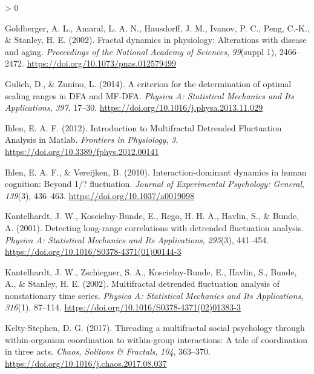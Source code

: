 \documentclass[
  english,
  man]{apa6}
\newlength{\cslhangindent}
\newenvironment{CSLReferences}[2] %
 {%
  \setlength{\parindent}{0pt}
  \ifodd #1 \everypar{\setlength{\hangindent}{\cslhangindent}}\ignorespaces\fi
  \ifnum #2 > 0
  \setlength{\parskip}{#2\baselineskip}
  \fi
 }%
 {}
\begin{document}
\begin{CSLReferences}{1}{0}
\leavevmode\hypertarget{ref-goldbergerFractalDynamicsPhysiology2002}{}%
Goldberger, A. L., Amaral, L. A. N., Hausdorff, J. M., Ivanov, P. C., Peng, C.-K., \& Stanley, H. E. (2002). Fractal dynamics in physiology: {Alterations} with disease and aging. \emph{Proceedings of the National Academy of Sciences}, \emph{99}(suppl 1), 2466--2472. \url{https://doi.org/10.1073/pnas.012579499}

\leavevmode\hypertarget{ref-gulichCriterionDeterminationOptimal2014}{}%
Gulich, D., \& Zunino, L. (2014). A criterion for the determination of optimal scaling ranges in {DFA} and {MF}-{DFA}. \emph{Physica A: Statistical Mechanics and Its Applications}, \emph{397}, 17--30. \url{https://doi.org/10.1016/j.physa.2013.11.029}

\leavevmode\hypertarget{ref-ihlenIntroductionMultifractalDetrended2012}{}%
Ihlen, E. A. F. (2012). Introduction to {Multifractal} {Detrended} {Fluctuation} {Analysis} in {Matlab}. \emph{Frontiers in Physiology}, \emph{3}. \url{https://doi.org/10.3389/fphys.2012.00141}

\leavevmode\hypertarget{ref-ihlen2010}{}%
Ihlen, E. A. F., \& Vereijken, B. (2010). Interaction-dominant dynamics in human cognition: Beyond 1/{{}}? fluctuation. \emph{Journal of Experimental Psychology: General}, \emph{139}(3), 436--463. \url{https://doi.org/10.1037/a0019098}

\leavevmode\hypertarget{ref-kantelhardtDetectingLongrangeCorrelations2001}{}%
Kantelhardt, J. W., Koscielny-Bunde, E., Rego, H. H. A., Havlin, S., \& Bunde, A. (2001). Detecting long-range correlations with detrended fluctuation analysis. \emph{Physica A: Statistical Mechanics and Its Applications}, \emph{295}(3), 441--454. \url{https://doi.org/10.1016/S0378-4371(01)00144-3}

\leavevmode\hypertarget{ref-kantelhardtMultifractalDetrendedFluctuation2002}{}%
Kantelhardt, J. W., Zschiegner, S. A., Koscielny-Bunde, E., Havlin, S., Bunde, A., \& Stanley, H. E. (2002). Multifractal detrended fluctuation analysis of nonstationary time series. \emph{Physica A: Statistical Mechanics and Its Applications}, \emph{316}(1), 87--114. \url{https://doi.org/10.1016/S0378-4371(02)01383-3}

\leavevmode\hypertarget{ref-kelty-stephenThreadingMultifractalSocial2017}{}%
Kelty-Stephen, D. G. (2017). Threading a multifractal social psychology through within-organism coordination to within-group interactions: {A} tale of coordination in three acts. \emph{Chaos, Solitons \& Fractals}, \emph{104}, 363--370. \url{https://doi.org/10.1016/j.chaos.2017.08.037}


\end{CSLReferences}
\end{document}
